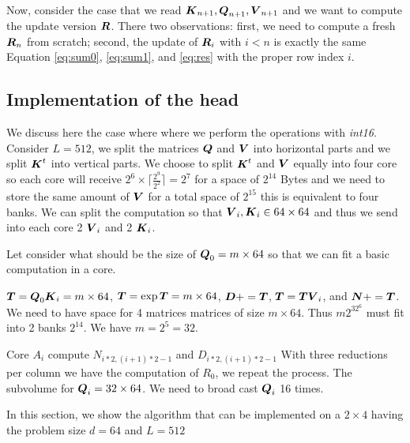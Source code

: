\documentclass[conference]{IEEEtran}
\begin{document}
Now, consider the case that we read
${\boldsymbol K}_{n+1},{\boldsymbol Q}_{n+1},{\boldsymbol V}_{n+1}$ and we want to compute the
update version ${\boldsymbol R}$. There two observations: first, we need to
compute a fresh ${\boldsymbol R}_n$ from scratch; second, the update of
${\boldsymbol R}_i$ with $i<n$ is exactly the same Equation \ref{eq:sum0},
\ref{eq:sum1}, and \ref{eq:res} with the proper row index $i$.







\newpage

\subsection{Implementation of the head}

We discuss here the case where where we perform the operations with
{\em int16}. Consider $L=512$, we split the matrices ${\boldsymbol Q}$ and
${\boldsymbol V}$ into horizontal parts and we split ${\boldsymbol K}^t$ into vertical
parts. We choose to split ${\boldsymbol K}^t$ and ${\boldsymbol V}$ equally into four
core so each core will receive $2^6\times
\lceil\frac{2^9}{2^2}\rceil=2^7$ for a space of $2^{14}$ Bytes and we
need to store the same amount of ${\boldsymbol V}$ for a total space of
$2^{15}$ this is equivalent to four banks. We can split the
computation so that ${\boldsymbol V}_i, {\boldsymbol K}_i \in 64\times 64$ and thus we
send into each core 2 ${\boldsymbol V}_i$ and 2 ${\boldsymbol K}_i$.

Let consider what should be the size of ${\boldsymbol Q}_0 = m \times 64$ so
that we can fit a basic computation in a core.

${\boldsymbol T} = {\boldsymbol Q}_0{\boldsymbol K}_i = m \times 64$, 
${\boldsymbol T} = \exp{{\boldsymbol T}} = m \times 64$,
${\boldsymbol D} += {\boldsymbol T}$, ${\boldsymbol T} = {\boldsymbol T}{\boldsymbol V}_i$, and ${\boldsymbol N} +=
{\boldsymbol T}$. We need to have space for 4 matrices matrices of size $ m
\times 64$. Thus $m2^32^6$ must fit into 2 banks $2^{14}$.  We have $m
= 2^5 = 32$.

Core $A_i$ compute $N_{i*2,(i+1)*2 -1}$ and $D_{i*2,(i+1)*2 -1}$ With
three reductions per column we have the computation of $R_0$, we
repeat the process.  The subvolume for ${\boldsymbol Q}_i = 32\times 64$.  We
need to broad cast ${\boldsymbol Q}_i$ 16 times.



In this section, we show the algorithm that can be implemented on a
$2\times 4$ having the problem size $d=64$ and $L=512$


\end{document}

